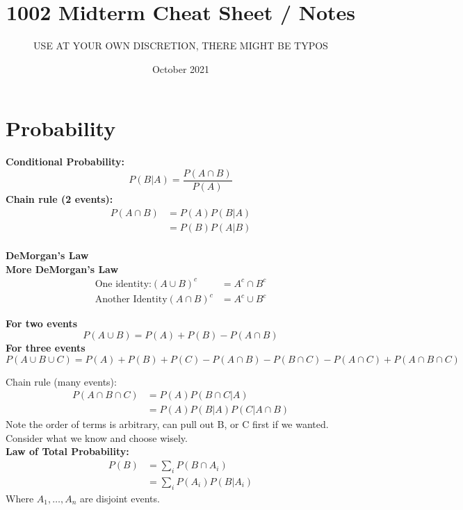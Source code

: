\documentclass[12pt,twoside]{article}
\title{1002 Midterm Cheat Sheet / Notes}
\author{USE AT YOUR OWN DISCRETION, THERE MIGHT BE TYPOS}
\date{October 2021}
\begin{document}
\maketitle

\newpage

\section{Probability}
\textbf{Conditional Probability:}
$$
    P(B|A) =\frac{P(A\cap B)}{P(A)}
$$  
\textbf{Chain rule (2 events):}
\begin{equation}
    \begin{split}
         P(A\cap B) &= P(A)P(B|A)  \\
                &= P(B)P(A|B)
    \end{split}
\end{equation}
\\
\textbf{DeMorgan's Law}\\

\textbf{More DeMorgan's Law}
\begin{equation}
    \begin{split}
        \text{One identity:} (A\cup B)^c &= A^c\cap B^c\\
        \text{Another Identity} (A\cap B)^c &= A^c \cup B^c
    \end{split}
\end{equation}

\textbf{For two events}
$$
    P(A\cup B) = P(A)+P(B) - P(A\cap B)
$$
\textbf{For three events}
$$
    P(A\cup B \cup C) = P(A)+P(B)+P(C) - P(A\cap B) - P(B\cap C) - P(A\cap C) + P(A\cap B \cap C)
$$

Chain rule (many events):
\begin{equation}
    \begin{split}
        P(A\cap B\cap C) &= P(A)P(B\cap C | A)\\
                            &= P(A)P(B|A)P(C|A\cap B)
    \end{split}
\end{equation}
Note the order of terms is arbitrary, can pull out B, or C first if we wanted. Consider what we know and choose wisely.\\

\textbf{Law of Total Probability:}
\begin{equation}
    \begin{split}
        P(B) &= \sum_{i}P(B\cap A_i)\\
        &= \sum_i P(A_i)P(B|A_i)
    \end{split}
\end{equation}
Where $A_1,\dots,A_n$ are disjoint events. \\
\end{document}
